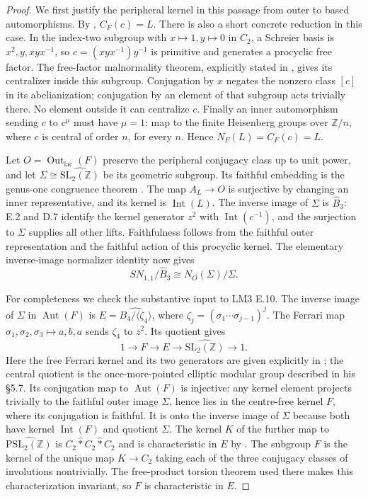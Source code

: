 \begin{proof}
We first justify the peripheral kernel in this passage from outer to
based automorphisms.  By \citet[\S1.3, Lemma~1]{Asada2001},
$C_F(c)=L$.  There is also a short concrete reduction in this case.
In the index-two subgroup with $x\mapsto1,y\mapsto0$ in $C_2$,
a Schreier basis is $x^2,y,xyx^{-1}$, so $c=(xyx^{-1})y^{-1}$ is
primitive and generates a procyclic free factor.  The free-factor
malnormality theorem, explicitly stated in
\citet[Proposition~4.4]{HaranJardenPop2002}, gives its centralizer
inside this subgroup.  Conjugation by $x$ negates the nonzero class
$[c]$ in its abelianization; conjugation by an element of that
subgroup acts trivially there.  No element outside it can centralize
$c$.  Finally an inner automorphism sending $c$ to $c^\mu$ must
have $\mu=1$: map to the finite Heisenberg groups over $\mathbb Z/n$,
where $c$ is central of order $n$, for every $n$.  Hence
$N_F(L)=C_F(c)=L$.

Let $O=\operatorname{Out}_{\mathrm{lac}}(F)$ preserve the peripheral
conjugacy class up to unit power, and let
$\Sigma\cong\widehat{\mathrm{SL}_2(\mathbb Z)}$ be its geometric
subgroup.  Its faithful embedding is the genus-one congruence theorem
\citep[\S7, Theorem~5]{Asada2001}.  The map $A_L\to O$ is surjective
by changing an inner representative, and its kernel is
$\operatorname{Int}(L)$.  The inverse image of $\Sigma$ is
$\widehat B_3$: E.2 and D.7 identify the kernel generator $z^2$ with
$\operatorname{Int}(c^{-1})$, and the surjection to $\Sigma$ supplies
all other lifts.  Faithfulness follows from the faithful outer
representation and the faithful action of this procyclic kernel.
The elementary inverse-image normalizer identity now gives
\[
 SN_{1,1}/\widehat B_3\cong N_O(\Sigma)/\Sigma.\tag{E.7.1}
\]

For completeness we check the substantive input to LM3 E.10.
The inverse image of $\Sigma$ in $\operatorname{Aut}(F)$ is
$E=\widehat{B_4/\langle\zeta_4\rangle}$, where
$\zeta_j=(\sigma_1\cdots\sigma_{j-1})^j$.  The Ferrari map
$\sigma_1,\sigma_2,\sigma_3\mapsto a,b,a$ sends
$\zeta_4$ to $z^2$.  Its quotient gives
\[
 1\to F\to E\to\widehat{\mathrm{SL}_2(\mathbb Z)}\to1.
\]
Here the free Ferrari kernel and its two generators are given
explicitly in \citet[(5.4.3)--(5.4.4)]{Nakamura2013Eisenstein};
the central quotient is the once-more-pointed elliptic modular
group described in his \S5.7.  Its conjugation map to
$\operatorname{Aut}(F)$ is injective: any kernel element projects
trivially to the faithful outer image $\Sigma$, hence lies in
the centre-free kernel $F$, where its conjugation is faithful.
It is onto the inverse image of $\Sigma$ because both have
kernel $\operatorname{Int}(F)$ and quotient $\Sigma$.
The kernel $K$ of the further map to
$\widehat{\mathrm{PSL}_2(\mathbb Z)}$ is
$C_2\mathbin{\widehat *}C_2\mathbin{\widehat *}C_2$ and is
characteristic in $E$ by
\citet[Proposition~3.2(iii), (3.5)]{MinamideNakamura2022}.
The subgroup $F$ is the kernel of the unique map $K\to C_2$ taking
each of the three conjugacy classes of involutions nontrivially.
The free-product torsion theorem used there makes this characterization
invariant, so $F$ is characteristic in $E$.


\end{proof}
